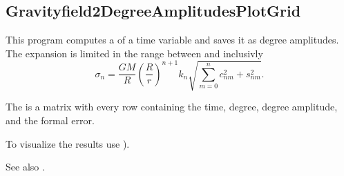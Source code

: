 \clearpage
\subsection{Gravityfield2DegreeAmplitudesPlotGrid}\label{Gravityfield2DegreeAmplitudesPlotGrid}
This program computes a 
of a time variable  and saves it as degree amplitudes.
The expansion is limited in the range between  and  inclusivly
\begin{equation}
  \sigma_n = \frac{GM}{R}\left(\frac{R}{r}\right)^{n+1}k_n\sqrt{\sum_{m=0}^n c_{nm}^2+s_{nm}^2}.
\end{equation}

The  is a matrix with
every row containing the time, degree, degree amplitude, and the formal error.

To visualize the results use ).

See also .



